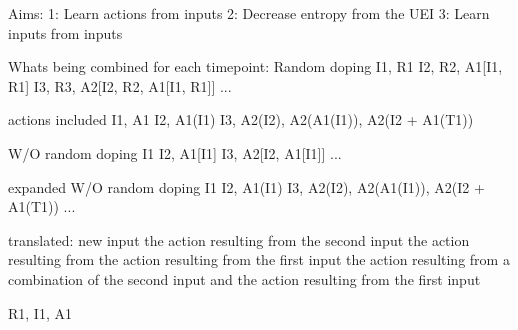 Aims:
1: Learn actions from inputs
2: Decrease entropy from the UEI
3: Learn inputs from inputs

Whats being combined for each timepoint:
Random doping
I1, R1
I2, R2, A1[I1, R1]
I3, R3, A2[I2, R2, A1[I1, R1]]
...

actions included
I1, A1
I2, A1(I1)
I3, A2(I2), A2(A1(I1)), A2(I2 + A1(T1))

W/O random doping
I1
I2, A1[I1]
I3, A2[I2, A1[I1]]
...

expanded W/O random doping
I1
I2, A1(I1)
I3, A2(I2), A2(A1(I1)), A2(I2 + A1(T1))
...

translated:
new input
the action resulting from the second input
the action resulting from the action resulting from the first input
the action resulting from a combination of the second input and the action resulting from the first input 

R1, I1, A1
